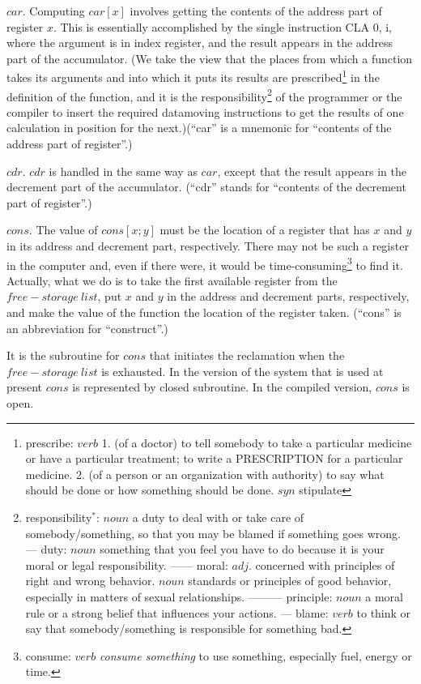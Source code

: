 \documentclass[11pt, a4paper]{article}
\begin{document}
$car$. Computing $car[x]$ involves getting the contents of the address part of
register $x$. This is essentially accomplished by the single instruction CLA 0,
i, where the argument is in index register, and the result appears in the
address part of the accumulator. (We take the view that the places from which a
function takes its arguments and into which it puts its results are
prescribed\footnote{prescribe: $verb$ 1. (of a doctor) to tell somebody to take
  a particular medicine or have a particular treatment; to write a PRESCRIPTION
  for a particular medicine. 2. (of a person or an organization with authority)
  to say what should be done or how something should be done. $syn$ stipulate}
in the definition of the function, and it is the
responsibility\footnote{responsibility$^*$: $noun$ a duty to deal with or take
  care of somebody/something, so that you may be blamed if something goes
  wrong. --- duty: $noun$ something that you feel you have to do because it is
  your moral or legal responsibility. ------ moral: $adj.$ concerned with
  principles of right and wrong behavior. $noun$ standards or principles of good
  behavior, especially in matters of sexual relationships. --------- principle:
  $noun$ a moral rule or a strong belief that influences your actions. ---
  blame: $verb$ to think or say that somebody/something is responsible for
  something bad.}
of the
programmer or the compiler to insert the required datamoving instructions to get
the results of one calculation in position for the next.)(``car'' is a mnemonic
for ``contents of the address part of register''.)

$cdr$. $cdr$ is handled in the same way as $car$, except that the result appears
in the decrement part of the accumulator. (``cdr'' stands for ``contents of the
decrement part of register''.)

$cons$. The value of $cons[x; y]$ must be the location of a register that has
$x$ and $y$ in its address and decrement part, respectively. There may not be
such a register in the computer and, even if there were, it would be
time-consuming\footnote{consume: $verb$ \textit{consume something} to use
  something, especially fuel, energy or time.}
to find it. Actually, what we do is to take the first available
register from the $free-storage \ list$, put $x$ and $y$ in the address and
decrement parts, respectively, and make the value of the function the location
of the register taken. (``cons'' is an abbreviation for ``construct''.)

It is the subroutine for $cons$ that initiates the reclamation when the
$free-storage \ list$ is exhausted. In the version of the system that is used at
present $cons$ is represented by closed subroutine. In the compiled version,
$cons$ is open.
\end{document}
